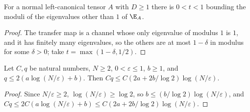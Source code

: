 \begin{lemma}
    \label{lem:ldp_normal_gap}
    \leanok
    For a normal left-canonical tensor $A$ with $D\geq1$ there is $0<t<1$
    bounding the moduli of the eigenvalues other than $1$ of $\E_A$.
\end{lemma}
\begin{proof}
    \leanok
    The transfer map is a channel whose only eigenvalue of modulus $1$ is $1$, and
    it has finitely many eigenvalues, so the others are at most $1-\delta$ in
    modulus for some $\delta>0$; take $t=\max(1-\delta,1/2)$.
\end{proof}

\begin{lemma}
    \label{lem:ldp_depth_log_window}
    \leanok
    Let $C,q$ be natural numbers, $N\geq2$, $0<\varepsilon\leq1$, $b\geq1$, and
    $q\leq2(a\log(N/\varepsilon)+b)$. Then
    $Cq\leq C(2a+2b/\log2)\log(N/\varepsilon)$.
\end{lemma}
\begin{proof}
    \leanok
    Since $N/\varepsilon\geq2$, $\log(N/\varepsilon)\geq\log2$, so
    $b\leq(b/\log2)\log(N/\varepsilon)$, and
    $Cq\leq2C(a\log(N/\varepsilon)+b)\leq C(2a+2b/\log2)\log(N/\varepsilon)$.
\end{proof}

